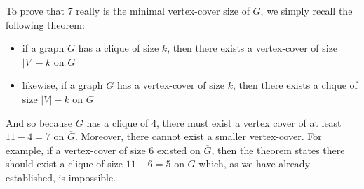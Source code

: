 \documentclass{article}
\begin{document}
To prove that 7 really is the minimal vertex-cover size of $\overline{G}$, we simply recall the following theorem:
\begin{itemize}
  \item if a graph $G$ has a clique of size $k$, then there exists a vertex-cover of size $|V|-k$ on $\overline{G}$
  \item likewise, if a graph $G$ has a vertex-cover of size $k$, then there exists a clique of size $|V|-k$ on $\overline{G}$
\end{itemize}

And so because $G$ has a clique of 4, there must exist a vertex cover of at least $11-4=7$ on $\overline{G}$. Moreover, there cannot exist a smaller vertex-cover. For example, if a vertex-cover of size 6 existed on $\overline{G}$, then the theorem states there should exist a clique of size $11-6=5$ on $G$ which, as we have already established, is impossible.
\end{document}
